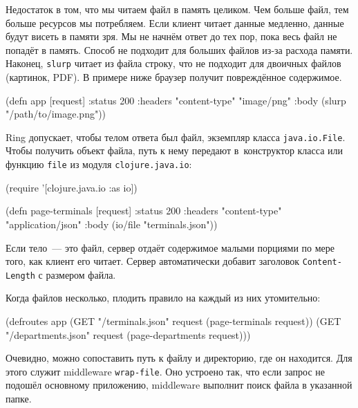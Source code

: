 Недостаток в том, что мы читаем файл в память целиком. Чем больше файл, тем
больше ресурсов мы потребляем. Если клиент читает данные медленно, данные будут
висеть в памяти зря. Мы не начнём ответ до тех пор, пока весь файл не
попадёт в память. Способ не подходит для больших файлов из-за расхода
памяти. Наконец, \verb|slurp| читает из файла строку, что не подходит для
двоичных файлов (картинок, PDF). В примере ниже браузер получит повреждённое
содержимое.

\begin{english}
  \begin{clojure}
(defn app [request]
  {:status 200
   :headers {"content-type" "image/png"}
   :body (slurp "/path/to/image.png")})
  \end{clojure}
\end{english}


Ring допускает, чтобы телом ответа был файл, экземпляр класса
\verb|java.io.File|. Чтобы получить объект файла, путь к нему передают
в~конструктор класса или функцию \verb|file| из модуля \verb|clojure.java.io|:

\begin{english}
  \begin{clojure}
(require '[clojure.java.io :as io])

(defn page-terminals
  [request]
  {:status 200
   :headers {"content-type" "application/json"}
   :body (io/file "terminals.json")})
  \end{clojure}
\end{english}


Если тело~--- это файл, сервер отдаёт содержимое малыми порциями по мере того, как
клиент его читает. Сервер автоматически добавит заголовок
\verb|Content-Length| с размером файла.

Когда файлов несколько, плодить правило на каждый из них утомительно:

\begin{english}
  \begin{clojure}
(defroutes app
  (GET "/terminals.json"   request (page-terminals request))
  (GET "/departments.json" request (page-departments request)))
  \end{clojure}
\end{english}


Очевидно, можно сопоставить путь к файлу и директорию, где он находится. Для
этого служит middleware \verb|wrap-file|. Оно устроено так, что если запрос не
подошёл основному приложению, middleware выполнит поиск файла в указанной папке.

